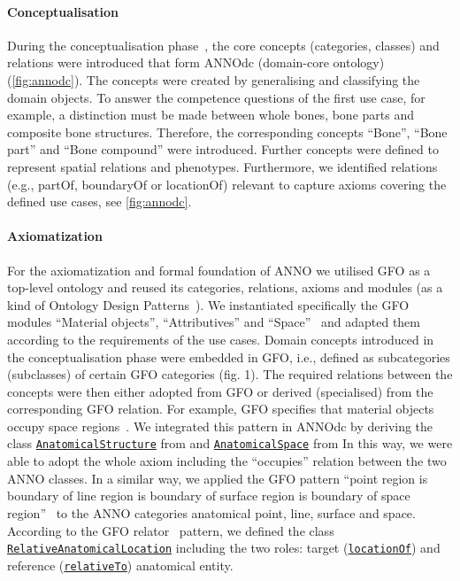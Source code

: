 \documentclass[sw]{iosart2x}
\newcommand{\anno}[1]{\href{https://annosaxfdm.de/ontology/#1}{\texttt{#1}}}
\begin{document}
\paragraph{Conceptualisation}
During the conceptualisation phase~\citep{herre2010}, the core concepts (categories, classes) and relations were introduced that form ANNOdc (domain-core ontology) (\cref{fig:annodc}).
The concepts were created by generalising and classifying the domain objects.
To answer the competence questions of the first use case, for example, a distinction must be made between whole bones, bone parts and composite bone structures.
Therefore, the corresponding concepts \enquote{Bone}, \enquote{Bone part} and \enquote{Bone compound} were introduced.
Further concepts were defined to represent spatial relations and phenotypes.
Furthermore, we identified relations (e.g., partOf, boundaryOf or locationOf) relevant to capture axioms covering the defined use cases, see \cref{fig:annodc}.

\paragraph{Axiomatization}
For the axiomatization and formal foundation of ANNO we utilised GFO as a top-level ontology and reused its categories, relations, axioms and modules (as a kind of Ontology Design Patterns~\citep{ODP2005, XD2016, MOMo2023}).
We instantiated specifically the GFO modules \enquote{Material objects}, \enquote{Attributives} and \enquote{Space}~\citep{Burek2020, Loebe2021, Loebe2018} and adapted them according to the requirements of the use cases.
Domain concepts introduced in the conceptualisation phase were embedded in GFO, i.e., defined as subcategories (subclasses) of certain GFO categories (fig. 1).
The required relations between the concepts were then either adopted from GFO or derived (specialised) from the corresponding GFO relation.
For example, GFO specifies that material objects occupy space regions~\citep{Loebe2021}.
We integrated this pattern in ANNOdc by deriving the class \anno{AnatomicalStructure} from  and \anno{AnatomicalSpace} from 
In this way, we were able to adopt the whole axiom including the \enquote{occupies} relation between the two ANNO classes.
In a similar way, we applied the GFO pattern \enquote{point region is boundary of line region is boundary of surface region is boundary of space region}~\citep{baumann2016} to the ANNO categories anatomical point, line, surface and space.
According to the GFO relator~\citep{Loebe2018} pattern, we defined the class \anno{RelativeAnatomicalLocation} including the two roles: target (\anno{locationOf}) and reference (\anno{relativeTo}) anatomical entity. %
\end{document}
